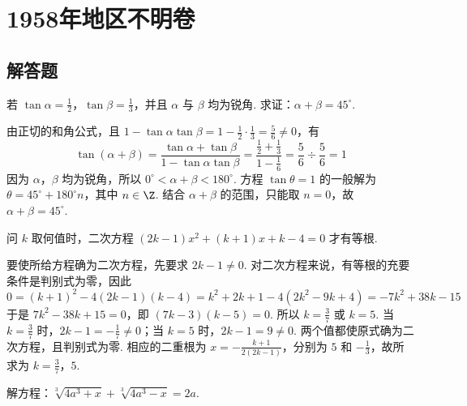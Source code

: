 \chapter{1958年地区不明卷}

\section{解答题}

\begin{problem}
若 \(\tan \alpha=\frac{1}{2}\)，\(\tan \beta=\frac{1}{3}\)，并且 \(\alpha\) 与 \(\beta\) 均为锐角. 求证：\(\alpha+\beta=45^\circ\).
\end{problem}

\begin{solution}
由正切的和角公式，且
\(1-\tan\alpha\tan\beta=1-\frac{1}{2}\cdot\frac{1}{3}=\frac{5}{6}\ne0\)，有
\[
\tan\left(\alpha+\beta\right)
=\frac{\tan\alpha+\tan\beta}{1-\tan\alpha\tan\beta}
=\frac{\frac{1}{2}+\frac{1}{3}}{1-\frac{1}{6}}
=\frac{5}{6}\div\frac{5}{6}=1
\]
因为 \(\alpha\)，\(\beta\) 均为锐角，所以 \(0^\circ<\alpha+\beta<180^\circ\). 方程 \(\tan\theta=1\) 的一般解为 \(\theta=45^\circ+180^\circ n\)，其中 \(n\in\Z\). 结合 \(\alpha+\beta\) 的范围，只能取 \(n=0\)，故 \(\alpha+\beta=45^\circ\).
\end{solution}

\begin{problem}
问 \(k\) 取何值时，二次方程 \(\left(2k-1\right)x^{2}+\left(k+1\right)x+k-4=0\) 才有等根.
\end{problem}

\begin{solution}
要使所给方程确为二次方程，先要求 \(2k-1\ne0\). 对二次方程来说，有等根的充要条件是判别式为零，因此
\[
0=\left(k+1\right)^2-4\left(2k-1\right)\left(k-4\right)
=k^2+2k+1-4\left(2k^2-9k+4\right)
=-7k^2+38k-15
\]
于是 \(7k^2-38k+15=0\)，即 \((7k-3)(k-5)=0\).
所以 \(k=\frac{3}{7}\) 或 \(k=5\). 当 \(k=\frac{3}{7}\) 时，\(2k-1=-\frac{1}{7}\ne0\)；当 \(k=5\) 时，\(2k-1=9\ne0\). 两个值都使原式确为二次方程，且判别式为零. 相应的二重根为
\(x=-\frac{k+1}{2\left(2k-1\right)}\)，分别为 \(5\) 和 \(-\frac{1}{3}\)，故所求为 \(k=\frac{3}{7}\)，\(5\).
\end{solution}

\begin{problem}
解方程：\(\sqrt[3]{4a^{3}+x}+\sqrt[3]{4a^{3}-x}=2a\).
\end{problem}

